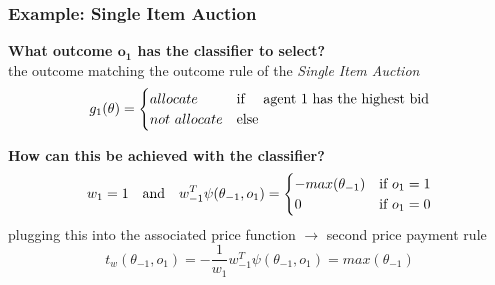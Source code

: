\documentclass{beamer}
\newcommand{\argmax}[1]{\underset{#1}{\operatorname{arg}\,\operatorname{max}}\;}
\begin{document}
\begin{frame}
	\frametitle{Example: Single Item Auction}
		{\small			
		\makebox[2.5cm]{$h_{w}(\theta) \in \argmax{o_{1} \in \Omega_{1}}$\hfill}\makebox[0.7cm]{\hfill$ +$\hfill}}

	\medskip
	\pause
	\textbf{What outcome $\mathbf{o_{1}}$ has the classifier to select?}\\ \pause
	{\small
	the outcome matching the outcome rule of the \emph{Single Item Auction}\\
	\begin{equation*}
	g_{1}(\theta) = 	\begin{cases}
	allocate & \text{if \quad  agent 1 has the highest bid}\\
	not \text{ } allocate & \text{else }
	\end{cases}
	\end{equation*}}
	
	\medskip
	\pause
	\textbf{How can this be achieved with the classifier?}\\\pause
	{\small	
	\begin{equation*}
	w_{1} = 1 \text{\quad and\quad} w_{-1}^T \psi(\theta_{-1},o_{1})= 
	\begin{cases}
	- max(\theta_{-1})& \text{if } o_{1} = 1\\
	0              & \text{if } o_{1} = 0
	\end{cases}
	\end{equation*}
	\pause
	plugging this into the associated price function $\rightarrow$ second price payment rule
	\begin{equation*}
		t_{w}(\theta_{-1}, o_{1}) = - \frac{1}{w_{1}} w_{-1}^T \psi(\theta_{-1},o_{1}) =  max(\theta_{-1})
	\end{equation*}}	
\end{frame}
\end{document}
